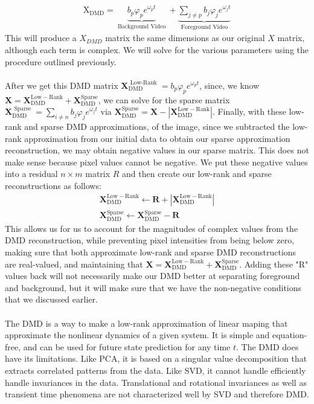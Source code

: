 \documentclass{article}
\begin{document}
\begin{align*}
\mathrm{X}_{\mathrm{DMD}}=\underbrace{b_{p} \varphi_{p} e^{\omega_{p} t}}_{\text { Background Video }}+\underbrace{\sum_{j \neq p} b_{j} \varphi_{j} e^{\omega_{j} t}}_{\text { Foreground Video }}
\end{align*}
This will produce a $X_{DMD}$ matrix the same dimensions as our original $X$ matrix, although each term is complex. We will solve for the various parameters using the procedure outlined previously. \\ \\
After we get this DMD matrix $\mathbf{X}_{\mathrm{DMD}}^{\text { Low-Rank }}=b_{p} \varphi_{p} e^{\omega_{p} t}$, since, we know $\mathbf{X}=\mathbf{X}_{\mathrm{DMD}}^{\mathrm{Low}-\mathrm{Rank}}+\mathbf{X}_{\mathrm{DMD}}^{\mathrm{Sparse}}$, we can solve for the sparse matrix $\mathbf{X}_{\mathrm{DMD}}^{\text { Sparse }}=\sum_{i \neq n} b_{j} \varphi_{j} e^{\omega_{j} t}$ via  $\mathbf{X}_{\mathrm{DMD}}^{\mathrm{Sparse}}=\mathbf{X}-\left|\mathbf{X}_{\mathrm{DMD}}^{\mathrm{Low}-\mathrm{Rank}}\right|$.  
Finally, with these low-rank and sparse DMD approximations, of the image, since we subtracted the low-rank approximation from our initial data to obtain our sparse approximation reconstruction, we may obtain negative values in our sparse matrix. This does not make sense because pixel values cannot be negative. We put these negative values into a residual $n\times m$ matrix $R$ and then create our low-rank and sparse reconstructions as follows: 
\begin{align*}
\mathbf{X}_{\mathrm{DMD}}^{\mathrm{Low}-\mathrm{Rank}} \leftarrow \mathbf{R}+\left|\mathbf{X}_{\mathrm{DMD}}^{\mathrm{Low}-\mathrm{Rank}}\right| \\
\mathbf{X}_{\mathrm{DMD}}^{\mathrm{Sparse}} \leftarrow \mathbf{X}_{\mathrm{DMD}}^{\mathrm{Sparse}}-\mathbf{R}
\end{align*}
This allows us for us to account for the magnitudes of complex values from the DMD reconstruction, while preventing pixel intensities from being below zero, making sure that both approximate low-rank and sparse DMD reconstructions are real-valued, and maintaining that $\mathbf{X}=\mathbf{X}_{\mathrm{DMD}}^{\mathrm{Low}-\mathrm{Rank}}+\mathbf{X}_{\mathrm{DMD}}^{\mathrm{Sparse}}$. Adding these "R" values back will not necessarily make our DMD better at separating foreground and background, but it will make sure that we have the non-negative conditions that we discussed earlier.
\\ \\ The DMD is a way to make a low-rank approximation of linear maping that approximate the nonlinear dynamics of a given system. It is simple and equation-free, and can be used for future state prediction for any time $t$. The DMD does have its limitations. Like PCA, it is based on a singular value decomposition that extracts correlated patterns from the data. Like SVD, it cannot handle efficiently handle invariances in the data. Translational and rotational invariances as well as transient time phenomena are not characterized well by SVD and therefore DMD. 
\end{document}
